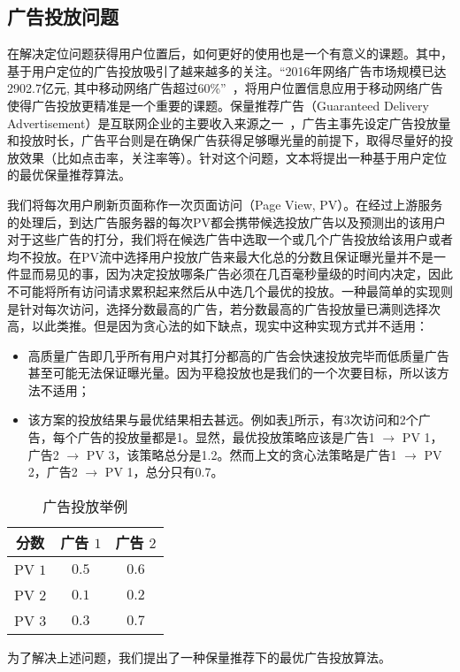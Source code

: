 \subsection{广告投放问题}

在解决定位问题获得用户位置后，如何更好的使用也是一个有意义的课题。其中，基于用户定位的广告投放吸引了越来越多的关注。“2016年网络广告市场规模已达2902.7亿元, 其中移动网络广告超过60\%”~\cite{赵杨2018基于机器学习混合算法的}，将用户位置信息应用于移动网络广告使得广告投放更精准是一个重要的课题。保量推荐广告（Guaranteed Delivery Advertisement）是互联网企业的主要收入来源之一~\cite{korula2016optimizing, mcafee2013maximally}，广告主事先设定广告投放量和投放时长，广告平台则是在确保广告获得足够曝光量的前提下，取得尽量好的投放效果（比如点击率，关注率等）。针对这个问题，文本将提出一种基于用户定位的最优保量推荐算法。

我们将每次用户刷新页面称作一次页面访问（Page  View, PV）。在经过上游服务的处理后，到达广告服务器的每次PV都会携带候选投放广告以及预测出的该用户对于这些广告的打分，我们将在候选广告中选取一个或几个广告投放给该用户或者均不投放。在PV流中选择用户投放广告来最大化总的分数且保证曝光量并不是一件显而易见的事，因为决定投放哪条广告必须在几百毫秒量级的时间内决定，因此不可能将所有访问请求累积起来然后从中选几个最优的投放。一种最简单的实现则是针对每次访问，选择分数最高的广告，若分数最高的广告投放量已满则选择次高，以此类推。但是因为贪心法的如下缺点，现实中这种实现方式并不适用：
\begin{itemize}
	\item 高质量广告即几乎所有用户对其打分都高的广告会快速投放完毕而低质量广告甚至可能无法保证曝光量。因为平稳投放也是我们的一个次要目标，所以该方法不适用；
	\item 该方案的投放结果与最优结果相去甚远。例如表\ref{tab:eoa}所示，有3次访问和2个广告，每个广告的投放量都是1。显然，最优投放策略应该是广告1 $\rightarrow$ PV 1，广告2 $\rightarrow$ PV 3，该策略总分是1.2。然而上文的贪心法策略是广告1 $\rightarrow$ PV 2，广告2 $\rightarrow$ PV 1，总分只有0.7。
\end{itemize}
\begin{table}[b]
	\centering
	\caption{广告投放举例}
	\label{tab:eoa}
	\begin{tabular}{ccc}
		\toprule
		分数 & 广告 $1$ & 广告 $2$ \\
		\midrule
		PV $1$ & $0.5$ & $0.6$ \\
		\midrule
		PV $2$ & $0.1$ & $0.2$ \\
		\midrule
		PV $3$ & $0.3$ & $0.7$ \\
		\bottomrule
	\end{tabular}
\end{table}
为了解决上述问题，我们提出了一种保量推荐下的最优广告投放算法。

